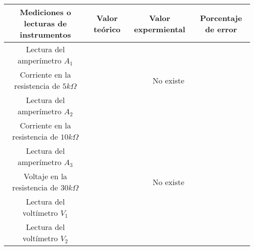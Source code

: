 \documentclass{article}
\begin{document}
\begin{table}[H]
	\centering
	\begin{tabular}{|c|c|c|c|}
		\hline
		Mediciones o lecturas de instrumentos & Valor teórico &
		Valor expermiental & Porcentaje de error\\
		\hline
		Lectura del amperímetro $A_1$\\
		\hline
		Corriente en la resistencia de $5k\Omega$ &
		\multicolumn{3}{c|}{No existe}\\
		\hline
		Lectura del amperímetro $A_2$\\
		\hline
		Corriente en la resistencia de $10k\Omega$\\
		\hline
		Lectura del amperímetro $A_3$\\
		\hline
		Voltaje en la resistencia de $30k\Omega$ &
		\multicolumn{3}{c|}{No existe}\\
		\hline
		Lectura del voltímetro $V_1$\\
		\hline
		Lectura del voltímetro $V_2$\\
		\hline
	\end{tabular}
\end{table}
\end{document}
